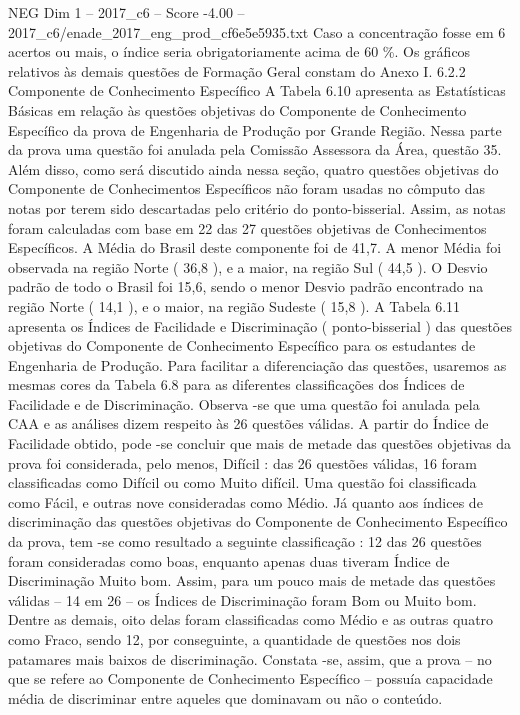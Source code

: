 \begin{textsample}{NEG Dim 1 – 2017\_c6 – Score -4.00 – 2017\_c6/enade\_2017\_eng\_prod\_cf6e5e5935.txt}
Caso a concentração fosse em 6 acertos ou mais, o índice seria obrigatoriamente acima de 60 \%.
Os gráficos relativos às demais questões de Formação Geral constam do Anexo I. 6.2.2 Componente de Conhecimento Específico A Tabela 6.10 apresenta as Estatísticas Básicas em relação às questões objetivas do Componente de Conhecimento Específico da prova de Engenharia de Produção por Grande Região.
Nessa parte da prova uma questão foi anulada pela Comissão Assessora da Área, questão 35.
Além disso, como será discutido ainda nessa seção, quatro questões objetivas do Componente de Conhecimentos Específicos não foram usadas no cômputo das notas por terem sido descartadas pelo critério do ponto-bisserial.
Assim, as notas foram calculadas com base em 22 das 27 questões objetivas de Conhecimentos Específicos.
A Média do Brasil deste componente foi de 41,7.
A menor Média foi observada na região Norte ( 36,8 ), e a maior, na região Sul ( 44,5 ).
O Desvio padrão de todo o Brasil foi 15,6, sendo o menor Desvio padrão encontrado na região Norte ( 14,1 ), e o maior, na região Sudeste ( 15,8 ).
A Tabela 6.11 apresenta os Índices de Facilidade e Discriminação ( ponto-bisserial ) das questões objetivas do Componente de Conhecimento Específico para os estudantes de Engenharia de Produção.
Para facilitar a diferenciação das questões, usaremos as mesmas cores da Tabela 6.8 para as diferentes classificações dos Índices de Facilidade e de Discriminação.
Observa -se que uma questão foi anulada pela CAA e as análises dizem respeito às 26 questões válidas.
A partir do Índice de Facilidade obtido, pode -se concluir que mais de metade das questões objetivas da prova foi considerada, pelo menos, Difícil : das 26 questões válidas, 16 foram classificadas como Difícil ou como Muito difícil.
Uma questão foi classificada como Fácil, e outras nove consideradas como Médio.
Já quanto aos índices de discriminação das questões objetivas do Componente de Conhecimento Específico da prova, tem -se como resultado a seguinte classificação : 12 das 26 questões foram consideradas como boas, enquanto apenas duas tiveram Índice de Discriminação Muito bom.
Assim, para um pouco mais de metade das questões válidas – 14 em 26 – os Índices de Discriminação foram Bom ou Muito bom.
Dentre as demais, oito delas foram classificadas como Médio e as outras quatro como Fraco, sendo 12, por conseguinte, a quantidade de questões nos dois patamares mais baixos de discriminação.
Constata -se, assim, que a prova – no que se refere ao Componente de Conhecimento Específico – possuía capacidade média de discriminar entre aqueles que dominavam ou não o conteúdo.

\end{textsample}
